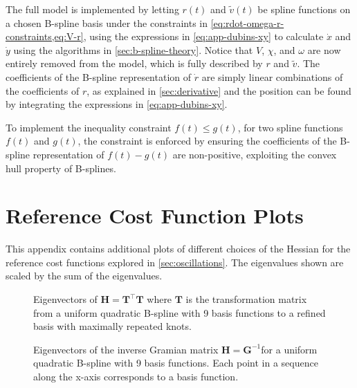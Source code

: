 The full model is implemented by letting $r(t)$ and $\tilde v(t)$ be spline functions on a chosen B-spline basis under the constraints in \cref{eq:rdot-omega-r-constraints,eq:V-r}, using the expressions in \cref{eq:app-dubins-xy} to calculate $\dot x$ and $\dot y$ using the algorithms in \cref{sec:b-spline-theory}. Notice that $V$, $\chi$, and $\omega$ are now entirely removed from the model, which is fully described by $r$ and $\tilde v$. The coefficients of the B-spline representation of $\dot r$ are simply linear combinations of the coefficients of $r$, as explained in \cref{sec:derivative} and the position can be found by integrating the expressions in \cref{eq:app-dubins-xy}.

To implement the inequality constraint $f(t) \le g(t)$, for two spline functions $f(t)$ and $g(t)$, the constraint is enforced by ensuring the coefficients of the B-spline representation of $f(t) - g(t)$ are non-positive, exploiting the convex hull property of B-splines. 




\chapter{Reference Cost Function Plots}\label{app:reference-cost-plots}


This appendix contains additional plots of different choices of the Hessian for the reference cost functions explored in \cref{sec:oscillations}. The eigenvalues shown are scaled by the sum of the eigenvalues.


\begin{figure}
    \centering
    
    \caption{Eigenvectors of $\mathbf H = \mathbf T^\top \mathbf T$ where $\mathbf T$ is the transformation matrix from a uniform quadratic B-spline with 9 basis functions to a refined basis with maximally repeated knots.}
    \label{fig:refined-basis-eigenvectors-9}
\end{figure} 

\begin{figure}
    \centering
    
    \caption{Eigenvectors of the inverse Gramian matrix $\mathbf H = \mathbf{G}^{-1}$for a uniform quadratic B-spline with 9 basis functions. Each point in a sequence along the x-axis corresponds to a basis function.}
    \label{fig:basis-inverse-gramian-eigenvectors-9}
\end{figure}

